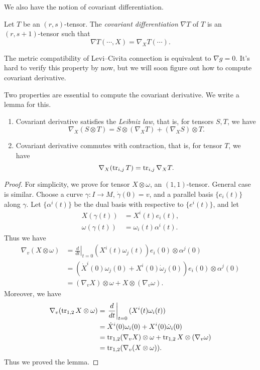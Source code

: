 We also have the notion of covariant differentiation.
\begin{defn}
    Let $T$ be an $(r,s)$-tensor.
    The \emph{covariant differentiation} $\nabla T$ of $T$ is an $(r,s+1)$-tensor such that
    \[\nabla T(\cdots,X)=\nabla_XT(\cdots).\]
\end{defn}

\begin{eg}
    The metric compatibility of Levi--Civita connection is equivalent to $\nabla g=0$.
    It's hard to verify this property by now, but we will soon figure out how to compute covariant derivative.
\end{eg}

Two properties are essential to compute the covariant derivative.
We write a lemma for this.

\begin{lem}
    \begin{enumerate}[\rm(1)]
        \item Covariant derivative satisfies the \emph{Leibniz law}, that is, for tensors $S,T$, we have
        \[\nabla_X(S\otimes T)=S\otimes(\nabla_XT)+(\nabla_XS)\otimes T.\]
        \item Covariant derivative commutes with contraction, that is, for tensor $T$, we have
        \[\nabla_X(\operatorname{tr}_{i,j}T)=\operatorname{tr}_{i,j}\nabla_XT.\]
    \end{enumerate}
\end{lem}
\begin{proof}
    For simplicity, we prove for tensor $X\otimes\omega$, an $(1,1)$-tensor.
    General case is similar.
    Choose a curve $\gamma:I\to M$, $\dot\gamma(0)=v$, and a parallel basis $\{e_i(t)\}$ along $\gamma$.
    Let $\{\alpha^i(t)\}$ be the dual basis with respective to $\{e^i(t)\}$, and let
    \begin{align*}
        X(\gamma(t))&=X^i(t)e_i(t),\\
        \omega(\gamma(t))&=\omega_i(t)\alpha^i(t).
    \end{align*}
    Thus we have
    \begin{align*}
        \nabla_v(X\otimes\omega)&=\left.\frac{d}{dt}\right|_{t=0}(X^i(t)\omega_j(t))e_i(0)\otimes\alpha^j(0)\\
        &=\left(\dot{X}^i(0)\omega_j(0)+X^i(0)\dot\omega_j(0)\right)e_i(0)\otimes\alpha^j(0)\\
        &=(\nabla_vX)\otimes\omega+X\otimes(\nabla_v\omega).
    \end{align*}
    Moreover, we have
    \begin{align*}
        \nabla_v(\operatorname{tr}_{1,2}X\otimes\omega)&=\left.\frac{d}{dt}\right|_{t=0}(X^i(t)\omega_i(t))\\
        &=\dot{X}^i(0)\omega_i(0)+X^i(0)\dot\omega_i(0)\\
        &=\operatorname{tr}_{1,2}(\nabla_vX)\otimes\omega+\operatorname{tr}_{1,2}X\otimes(\nabla_v\omega)\\
        &=\operatorname{tr}_{1,2}(\nabla_v(X\otimes\omega)).
    \end{align*}
    Thus we proved the lemma.
\end{proof}

